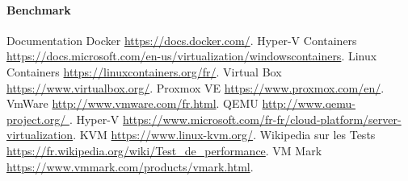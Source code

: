 \documentclass[french]{article}
\begin{document}
\paragraph{Benchmark}
\newpage
\begin{thebibliography}{9}

          Documentation Docker
          \url{https://docs.docker.com/}.
          Hyper-V Containers
          \url{https://docs.microsoft.com/en-us/virtualization/windowscontainers}.
         Linux Containers
         \url{https://linuxcontainers.org/fr/}.
         Virtual Box
         \url{ https://www.virtualbox.org/}.
         Proxmox VE
         \url{https://www.proxmox.com/en/}.
         VmWare
         \url{ http://www.vmware.com/fr.html}.
         QEMU
         \url{http://www.qemu-project.org/   }.
         Hyper-V
         \url{https://www.microsoft.com/fr-fr/cloud-platform/server-virtualization}.      
         KVM
         \url{https://www.linux-kvm.org/}.
         Wikipedia sur les Tests
         \url{https://fr.wikipedia.org/wiki/Test_de_performance}.
         VM Mark
         \url{https://www.vmmark.com/products/vmark.html}.
         
         
\end{thebibliography}
\end{document}
